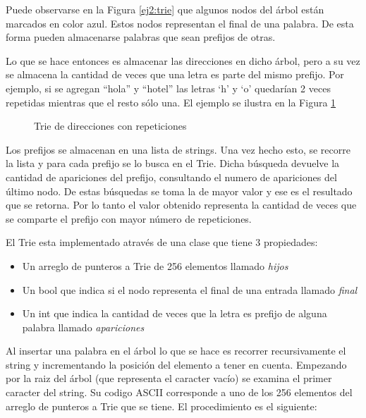 Puede observarse en la Figura \ref{ej2:trie} que algunos nodos del árbol están
marcados en color azul. Estos nodos representan el final de una palabra. De
esta forma pueden almacenarse palabras que sean prefijos de otras.

Lo que se hace entonces es almacenar las direcciones en dicho árbol, pero a
su vez se almacena la cantidad de veces que una letra es parte del mismo
prefijo. Por ejemplo, si se agregan ``hola'' y ``hotel'' las letras `h' y `o'
quedarían 2 veces repetidas mientras que el resto sólo una. El ejemplo se
ilustra en la Figura \ref{ej2:trie_rep}

\begin{figure}[ht]
	\caption{Trie de direcciones con repeticiones}
	\label{ej2:trie_rep}
	\centering
\end{figure}

Los prefijos se almacenan en una lista de strings. Una vez hecho esto, se
recorre la lista y para cada prefijo se lo busca en el Trie. Dicha búsqueda
devuelve la cantidad de apariciones del prefijo, consultando el numero de
apariciones del último nodo. De estas búsquedas se toma la de mayor valor y
ese es el resultado que se retorna. Por lo tanto el valor obtenido representa
la cantidad de veces que se comparte el prefijo con mayor número de
repeticiones.

El Trie esta implementado através de una clase que tiene 3 propiedades:

\begin{itemize}
	\item Un arreglo de punteros a Trie de 256 elementos llamado \textit{hijos}
	\item Un bool que indica si el nodo representa el final de una entrada
	llamado \textit{final}
	\item Un int que indica la cantidad de veces que la letra es prefijo de
	alguna palabra llamado \textit{apariciones}
\end{itemize}

Al insertar una palabra en el árbol lo que se hace es recorrer recursivamente
el string y incrementando la posición del elemento a tener en cuenta.
Empezando por la raiz del árbol (que representa el caracter vacío) se examina
el primer caracter del string. Su codigo ASCII corresponde a uno de los 256
elementos del arreglo de punteros a Trie que se tiene. El procedimiento es el
siguiente:

